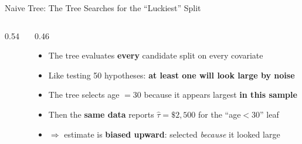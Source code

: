 \documentclass[hyperref={pdfpagelabels=false}]{beamer}
\begin{document}
\begin{frame}{Naive Tree: The Tree Searches for the ``Luckiest'' Split}
\begin{columns}[T]
\begin{column}{0.54\textwidth}
\begin{center}
		\end{center}
	\end{column}
	\begin{column}{0.46\textwidth}
		\small
		\begin{itemize}
			\item The tree evaluates \textbf{every} candidate split on every covariate
			\vspace{0.2cm}
			\item Like testing 50 hypotheses: \textbf{at least one will look large by noise}
			\vspace{0.2cm}
			\item The tree selects age $=30$ because it appears largest \textbf{in this sample}
			\vspace{0.2cm}
			\item Then the \textbf{same data} reports $\hat{\tau}=\$2{,}500$ for the ``age$<30$'' leaf
			\vspace{0.2cm}
			\item $\Rightarrow$ estimate is \textbf{biased upward}: selected \textit{because} it looked large
		\end{itemize}
	\end{column}
\end{columns}
\end{frame}
\end{document}
